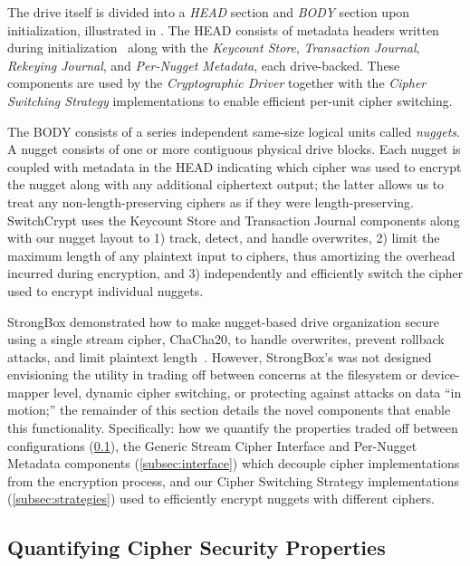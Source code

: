 The drive itself is divided into a \emph{HEAD} section and \emph{BODY} section
upon initialization, illustrated in . The HEAD consists of
metadata headers written during initialization~\cite{StrongBox} along with the
\emph{Keycount Store}, \emph{Transaction Journal}, \emph{Rekeying Journal}, and
\emph{Per-Nugget Metadata}, each drive-backed. These components are used by the
\emph{Cryptographic Driver} together with the \emph{Cipher Switching Strategy}
implementations to enable efficient per-unit cipher switching.

The BODY consists of a series independent same-size logical units called
\emph{nuggets}. A nugget consists of one or more contiguous physical drive
blocks. Each nugget is coupled with metadata in the HEAD indicating which cipher
was used to encrypt the nugget along with any additional ciphertext output; the
latter allows us to treat any non-length-preserving ciphers as if they were
length-preserving. SwitchCrypt uses the Keycount Store and Transaction Journal
components along with our nugget layout to 1) track, detect, and handle
overwrites, 2) limit the maximum length of any plaintext input to ciphers, thus
amortizing the overhead incurred during encryption, and 3) independently and
efficiently switch the cipher used to encrypt individual nuggets.

StrongBox demonstrated how to make nugget-based drive organization secure using
a single stream cipher, ChaCha20, to handle overwrites, prevent rollback
attacks, and limit plaintext length~\cite{StrongBox}. However, StrongBox's was
not designed envisioning the utility in trading off between concerns at the
filesystem or device-mapper level, dynamic cipher switching, or protecting
against attacks on data ``in motion;'' the remainder of this section details the
novel components that enable this functionality. Specifically: how we quantify
the properties traded off between configurations (\cref{subsec:quantify}), the
Generic Stream Cipher Interface and Per-Nugget Metadata components
(\cref{subsec:interface}) which decouple cipher implementations from the
encryption process, and our Cipher Switching Strategy implementations
(\cref{subsec:strategies}) used to efficiently encrypt nuggets with different
ciphers.

\subsection{Quantifying Cipher Security Properties} \label{subsec:quantify}

